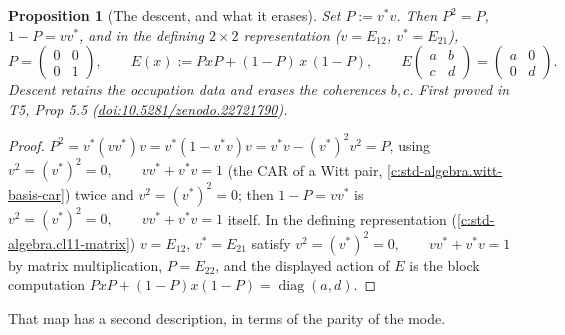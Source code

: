 \documentclass[11pt]{article}
\newtheorem{proposition}[theorem]{Proposition}
\theoremstyle{definition}
\theoremstyle{plain}
\begin{document}
\begin{proposition}[The descent, and what it erases]\label{c:singularity.descent-what-it-erases}
Set $P := v^* v$. Then $P^2 = P$, $1 - P = v v^*$, and in the defining $2 \times 2$ representation ($v = E_{12}$, $v^* = E_{21}$),
\[
P = \begin{pmatrix} 0 & 0 \\ 0 & 1 \end{pmatrix}, \qquad
E(x) := P x P + (1{-}P)\,x\,(1{-}P), \qquad
E\begin{pmatrix} a & b \\ c & d \end{pmatrix} = \begin{pmatrix} a & 0 \\ 0 & d \end{pmatrix} .
\]
Descent retains the occupation data and erases the coherences $b, c$.
\emph{First proved in} T5, Prop 5.5 (\href{https://doi.org/10.5281/zenodo.22721790}{doi:10.5281/zenodo.22721790}).
\end{proposition}
\begin{proof}
$P^2 = v^*(v v^*)v = v^*(1 - v^* v)v = v^* v - (v^*)^2 v^2 = P$, using $v^2 = (v^*)^2 = 0, \qquad v v^* + v^* v = 1$ (the CAR of a Witt pair, \ref{c:std-algebra.witt-basis-car}) twice and $v^2 = (v^*)^2 = 0$; then $1 - P = vv^*$ is $v^2 = (v^*)^2 = 0, \qquad v v^* + v^* v = 1$ itself. In the defining representation (\ref{c:std-algebra.cl11-matrix}) $v = E_{12}$, $v^*= E_{21}$ satisfy $v^2 = (v^*)^2 = 0, \qquad v v^* + v^* v = 1$ by matrix multiplication, $P = E_{22}$, and the displayed action of $E$ is the block computation $PxP + (1{-}P)x(1{-}P) = \operatorname{diag}(a, d)$.

\end{proof}

That map has a second description, in terms of the parity of the mode.
\end{document}
